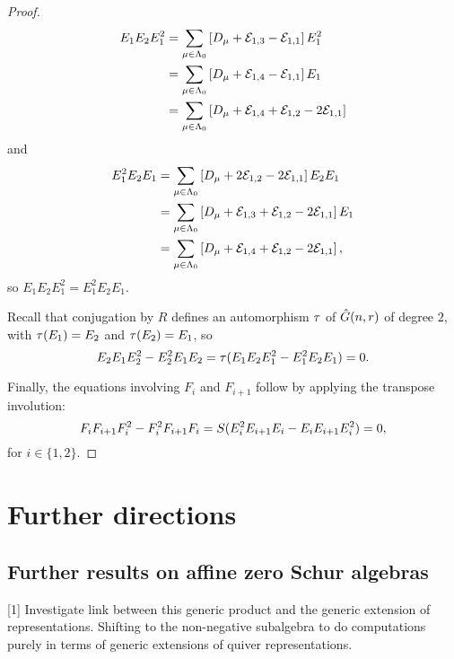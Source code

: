 \documentclass[a4paper, 11pt]{report}
\begin{document}
\begin{proof}
\begin{align*}
E_1E_2E_1^2 &= \sum_{\mu\in\Lambda_0{}} \left[D_{\mu}+\mathcal{E}_{1,3}-\mathcal{E}_{1,1}\right]E_1^2\\
&= \sum_{\mu\in\Lambda_0{}} \left[D_{\mu}+\mathcal{E}_{1,4}-\mathcal{E}_{1,1}\right]E_1\\
&= \sum_{\mu\in\Lambda_0{}} \left[D_{\mu}+\mathcal{E}_{1,4}+\mathcal{E}_{1,2}-2\mathcal{E}_{1,1}\right]
\end{align*}
and
\begin{align*}
E_1^2E_2E_1 &= \sum_{\mu\in\Lambda_0{}} \left[D_{\mu}+2\mathcal{E}_{1,2}-2\mathcal{E}_{1,1}\right]E_2E_1\\
&= \sum_{\mu\in\Lambda_0{}} \left[D_{\mu}+\mathcal{E}_{1,3}+\mathcal{E}_{1,2}-2\mathcal{E}_{1,1}\right]E_1\\
&= \sum_{\mu\in\Lambda_0{}} \left[D_{\mu}+\mathcal{E}_{1,4}+\mathcal{E}_{1,2}-2\mathcal{E}_{1,1}\right],
\end{align*}
so $E_1E_2E_1^2 = E_1^2E_2E_1$.

Recall that conjugation by $R$ defines an automorphism $\tau{}$ of $\hat{G}(n,r)$ of degree $2$, with $\tau{(E_1)}=E_2$ and $\tau{(E_2)}=E_1$, so
\begin{equation*}
E_2E_1E_2^2 - E_2^2E_1E_2 = \tau{(E_1E_2E_1^2-E_1^2E_2E_1)} = 0.
\end{equation*}

Finally, the equations involving $F_i$ and $F_{i+1}$ follow by applying the transpose involution:
\begin{equation*}
F_iF_{i+1}F_i^2 - F_i^2F_{i+1}F_i = S{(E_i^2E_{i+1}E_i-E_iE_{i+1}E_i^2)} = 0,
\end{equation*}
for $i\in\{1,2\}$.
\end{proof}



\chapter{Further directions}

\section{Further results on affine zero Schur algebras}

[1] Investigate link between this generic product and the generic extension of representations. Shifting to the non-negative subalgebra to do computations purely in terms of generic extensions of quiver representations.


\nocite{*}
\printbibliography
\end{document}
